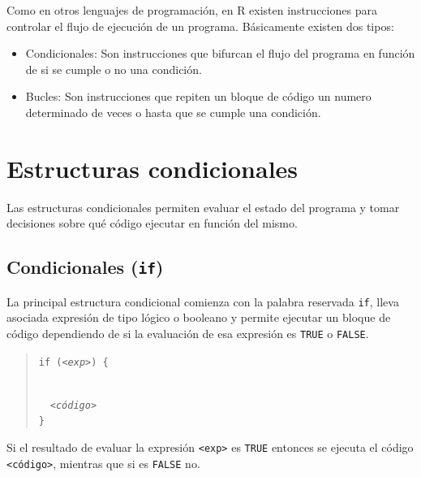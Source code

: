 \documentclass[
  a4paper,
]{scrreport}
\providecommand{\tightlist}{%
  \setlength{\itemsep}{0pt}\setlength{\parskip}{0pt}}\usepackage{longtable,booktabs,array}
\theoremstyle{definition}
\theoremstyle{definition}
\theoremstyle{remark}
\begin{document}
Como en otros lenguajes de programación, en R existen instrucciones para
controlar el flujo de ejecución de un programa. Básicamente existen dos
tipos:

\begin{itemize}
\tightlist
\item
  Condicionales: Son instrucciones que bifurcan el flujo del programa en
  función de si se cumple o no una condición.
\item
  Bucles: Son instrucciones que repiten un bloque de código un numero
  determinado de veces o hasta que se cumple una condición.
\end{itemize}

\hypertarget{estructuras-condicionales}{%
\section{Estructuras condicionales}\label{estructuras-condicionales}}

Las estructuras condicionales permiten evaluar el estado del programa y
tomar decisiones sobre qué código ejecutar en función del mismo.

\hypertarget{condicionales-if}{%
\subsection{\texorpdfstring{Condicionales
(\texttt{if})}{Condicionales (if)}}\label{condicionales-if}}

La principal estructura condicional comienza con la palabra reservada
\texttt{if}, lleva asociada expresión de tipo lógico o booleano y
permite ejecutar un bloque de código dependiendo de si la evaluación de
esa expresión es \texttt{TRUE} o \texttt{FALSE}.

\begin{quote}
\texttt{if\ (}\emph{\texttt{\textless{}exp\textgreater{}}}\texttt{)\ \{}\strut \\
  \emph{\texttt{\textless{}código\textgreater{}}}\\
\texttt{\}}
\end{quote}

Si el resultado de evaluar la expresión
\texttt{\textless{}exp\textgreater{}} es \texttt{TRUE} entonces se
ejecuta el código \texttt{\textless{}código\textgreater{}}, mientras que
si es \texttt{FALSE} no.
\end{document}
